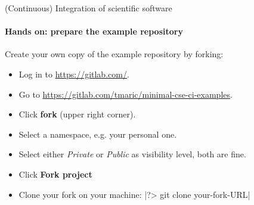 \begin{frame}{(Continuous) Integration of scientific software}
    \framesubtitle{Hands on: prepare the example repository}
    Create your own copy of the example repository by forking:
    \begin{itemize}
        \item Log in to \href{https://gitlab.com/}{https://gitlab.com/}.
        \item Go to \href{https://gitlab.com/tmaric/minimal-cse-ci-examples}{https://gitlab.com/tmaric/minimal-cse-ci-examples}.
        \item Click \textbf{fork} (upper right corner).
        \item Select a namespace, e.g. your personal one.
        \item Select either \emph{Private} or \emph{Public} as visibility level, both are fine.
        \item Click \textbf{Fork project}
        \item Clone your fork on your machine: |?> git clone your-fork-URL|
    \end{itemize}
\end{frame}
